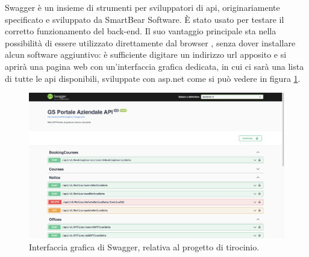 Swagger è un insieme di strumenti per sviluppatori di \acrshort{api}, originariamente specificato e sviluppato da SmartBear Software. \cite{swagger}
È stato usato per testare il corretto funzionamento del back-end. Il suo vantaggio principale sta nella possibilità di essere utilizzato direttamente dal browser \cite{swagger.io}, senza dover installare alcun software aggiuntivo: è sufficiente digitare un indirizzo \acrshort{url} apposito e si aprirà una pagina web con un'interfaccia grafica dedicata, in cui ci sarà una lista di tutte le \acrshort{api} disponibili, sviluppate con \acrshort{asp.net} come si può vedere in figura \ref{fig:swagger}.
\begin{figure}[H]
\centering
\includegraphics[width=1\textwidth]{Images/swagger.jpg}
\caption{\label{fig:swagger}Interfaccia grafica di Swagger, relativa al progetto di tirocinio.}
\end{figure}